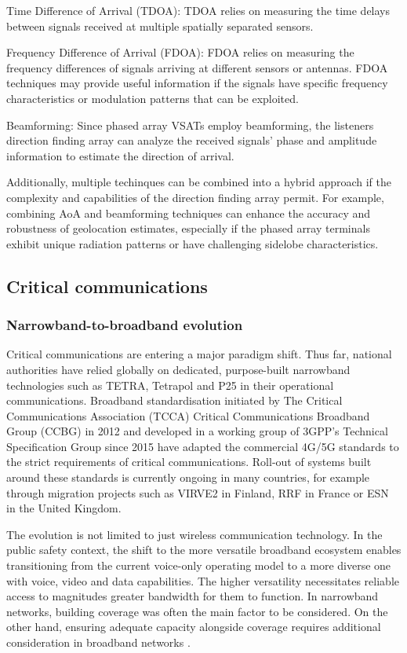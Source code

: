 \documentclass[english, 12pt, a4paper, elec, utf8, a-1b, online]{aaltothesis}
\begin{document}
Time Difference of Arrival (TDOA): TDOA relies on measuring the time delays between signals received at multiple spatially separated sensors.

Frequency Difference of Arrival (FDOA): FDOA relies on measuring the frequency differences of signals arriving at different sensors or antennas.
FDOA techniques may provide useful information if the signals have specific frequency characteristics or modulation patterns that can be exploited.

Beamforming: Since phased array VSATs employ beamforming, the listeners direction finding array can analyze the received signals' phase and amplitude information to estimate the direction of arrival.

Additionally, multiple techinques can be combined into a hybrid approach if the complexity and capabilities of the direction finding array permit.
For example, combining AoA and beamforming techniques can enhance the accuracy and robustness of geolocation estimates, especially if the phased array terminals exhibit unique radiation patterns or have challenging sidelobe characteristics.

\clearpage

\subsection{Critical communications}
\subsubsection{Narrowband-to-broadband evolution}
Critical communications are entering a major paradigm shift. Thus far, national authorities have relied globally on dedicated, purpose-built narrowband technologies such as TETRA, Tetrapol and P25 in their operational communications. Broadband standardisation initiated by The Critical Communications Association (TCCA) Critical Communications Broadband Group (CCBG) in 2012 and developed in a working group of 3GPP’s Technical Specification Group since 2015 have adapted the commercial 4G/5G standards to the strict requirements of critical communications. Roll-out of systems built around these standards is currently ongoing in many countries, for example through migration projects such as VIRVE2 in Finland, RRF in France or ESN in the United Kingdom.

The evolution is not limited to just wireless communication technology. In the public safety context, the shift to the more versatile broadband ecosystem enables transitioning from the current voice-only operating model to a more diverse one with voice, video and data capabilities. The higher versatility necessitates reliable access to magnitudes greater bandwidth for them to function. In narrowband networks, building coverage was often the main factor to be considered. On the other hand, ensuring adequate capacity alongside coverage requires additional consideration in broadband networks \cite{saynevirta2021satellite}.
\end{document}
